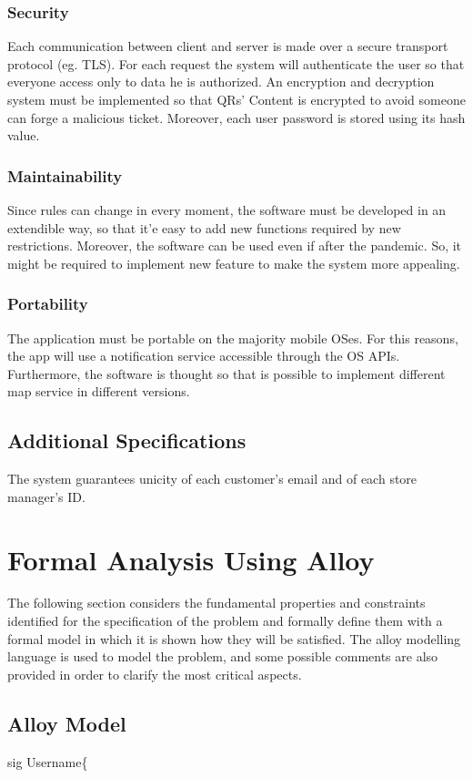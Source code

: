 \documentclass{article}
\begin{document}
		\subsubsection{Security}
		Each communication between client and server is made over a secure transport protocol (eg. TLS). For each request the system will authenticate the user so that everyone access only to data he is authorized. An encryption and decryption system must be implemented so that QRs' Content is encrypted to avoid someone can forge a malicious ticket. Moreover, each user password is stored using its hash value. 
		\subsubsection{Maintainability}
		Since rules can change in every moment, the software must be developed in an extendible way, so that it'e easy to add new functions required by new restrictions. Moreover, the software can be used even if after the pandemic. So, it might be required to implement new feature to make the system more appealing.
		\subsubsection{Portability}
		The application must be portable on the majority mobile OSes. For this reasons, the app will use a notification service accessible through the OS APIs. Furthermore, the software is thought so that is possible to implement different map service in different versions.
		\subsection{Additional Specifications}
	The system guarantees unicity of each customer's email and of each store manager's ID.
	
	\newpage
	
\section{Formal Analysis Using Alloy}
	The following section considers the fundamental properties and constraints identified for the specification of the problem and formally define them with a formal model in which it is shown how they will be satisfied. The alloy modelling language is used to model the problem, and some possible comments are also provided in order to clarify the most critical aspects. 
	\subsection{Alloy Model}
	sig Username\{
	
\end{document}
